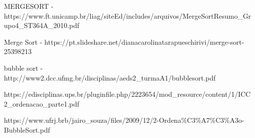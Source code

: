 \documentclass[11pt]{article}
\begin{document}
MERGESORT -
https://www.ft.unicamp.br/liag/siteEd/includes/arquivos/MergeSortResumo\_Grupo4\_ST364A\_2010.pdf

Merge Sort -
https://pt.slideshare.net/dianacarolinatarapueschirivi/merge-sort-25398213

bubble sort -
http://www2.dcc.ufmg.br/disciplinas/aeds2\_turmaA1/bubblesort.pdf

https://edisciplinas.ups.br/pluginfile.php/2223654/mod\_resource/content/1/ICC2\_ordenacao\_parte1.pdf

https://www.ufrj.brb/jairo\_souza/files/2009/12/2-Ordena\%C3\%A7\%C3\%A3o-BubbleSort.pdf


    
    
    
    
\end{document}
